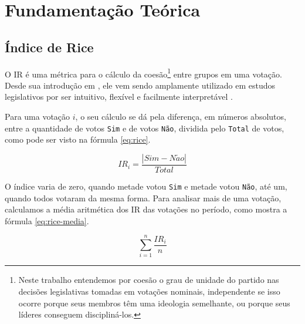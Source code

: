 \documentclass[a4paper,titlepage]{ppgi}\usepackage[]{graphicx}\usepackage[]{color}
\begin{document}





\chapter{Fundamentação Teórica}\label{cap:fundamentacao}

\section{Índice de Rice}

O \gls{IR} é uma métrica para o cálculo da coesão\footnote{Neste trabalho
entendemos por coesão o grau de unidade do partido nas decisões legislativas
tomadas em votações nominais, independente se isso ocorre porque seus membros
têm uma ideologia semelhante, ou porque seus líderes conseguem discipliná-los.}
entre grupos em uma votação. Desde sua introdução em \cite{Rice1924}, ele vem
sendo amplamente utilizado em estudos legislativos por ser intuitivo, flexível
e facilmente interpretável \cite{Neiva2011}.

Para uma votação $i$, o seu cálculo se dá pela diferença, em números absolutos,
entre a quantidade de votos \verb|Sim| e de votos \verb|Não|, dividida pelo
\verb|Total| de votos, como pode ser visto na fórmula \ref{eq:rice}.

\begin{equation}\label{eq:rice}
  IR_i = \frac{|Sim - N\tilde{a}o|}{Total}
\end{equation}

O índice varia de zero, quando metade votou \verb|Sim| e metade votou
\verb|Não|, até um, quando todos votaram da mesma forma. Para analisar mais de
uma votação, calculamos a média aritmética dos \gls{IR} das votações no
período, como mostra a fórmula \ref{eq:rice-media}.

\begin{equation}\label{eq:rice-media}
  \sum_{i=1}^{n} \frac{IR_i}{n}
\end{equation}

\end{document}
